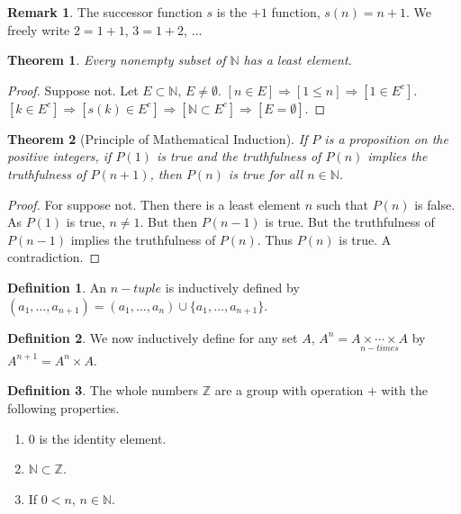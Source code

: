 \documentclass[oneside]{book}
\newtheorem{theorem}{Theorem}[section]
\theoremstyle{definition}
\newtheorem{definition}{Definition}[section]
\newtheorem{remark}{Remark}[section]
\begin{document}
\begin{remark}
The successor function $s$ is the $+1$ function, $s(n)=n+1$. We freely write $2=1+1$, $3=1+2$, $\hdots$
\end{remark}

\begin{theorem}
Every nonempty subset of $\mathbb{N}$ has a least element.
\end{theorem}
\begin{proof}
Suppose not. Let $E\subset \mathbb{N}$, $E\ne\emptyset$. $[n\in E]\Rightarrow [1\leq n]\Rightarrow [1\in E^c]$. $[k\in E^c]\Rightarrow [s(k)\in E^c]\Rightarrow [\mathbb{N} \subset E^c]\Rightarrow [E = \emptyset]$.
\end{proof}

\begin{theorem}[Principle of Mathematical Induction]
If $P$ is a proposition on the positive integers, if $P(1)$ is true and the truthfulness of $P(n)$ implies the truthfulness of $P(n+1)$, then $P(n)$ is true for all $n\in \mathbb{N}$.
\end{theorem}
\begin{proof}
For suppose not. Then there is a least element $n$ such that $P(n)$ is false. As $P(1)$ is true, $n\ne 1$. But then $P(n-1)$ is true. But the truthfulness of $P(n-1)$ implies the truthfulness of $P(n)$. Thus $P(n)$ is true. A contradiction.
\end{proof}

\begin{definition}
An $n-tuple$ is inductively defined by $(a_1,\hdots,a_{n+1}) = (a_1,\hdots, a_n)\cup \{a_1,\hdots,a_{n+1}\}$.
\end{definition}

\begin{definition}
We now inductively define for any set $A$, $A^{n} = \underset{n-times}{A\times \cdots \times A}$ by $A^{n+1} = A^n \times A$.
\end{definition}

\begin{definition}
The whole numbers $\mathbb{Z}$ are a group with operation $+$ with the following properties.
\begin{enumerate}
\item $0$ is the identity element.
\item $\mathbb{N}\subset \mathbb{Z}$.
\item If $0<n$, $n\in \mathbb{N}$.
\end{enumerate}
\end{definition}
\end{document}
